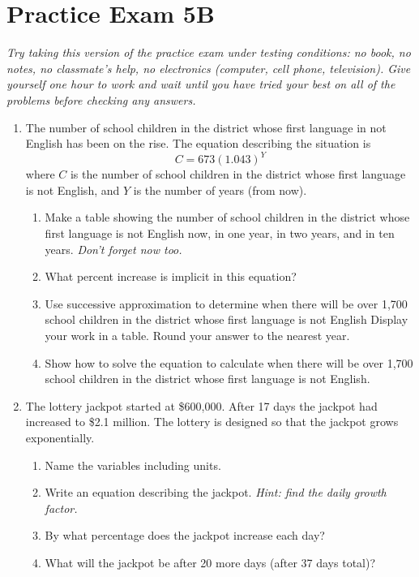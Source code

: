 
\section*{Practice Exam 5B}  

\emph{Try taking this version of the practice exam under testing conditions:  no book, no notes, no classmate's help, no electronics (computer, cell phone, television). Give yourself one hour to work and wait until you have tried your best on all of the problems before checking any answers.}

\noindent \hrulefill

\begin{enumerate}

\item The number of school children in the district whose first language in not English has been on the rise.  The equation describing the situation is $$C=673(1.043)^Y$$ where $C$ is the number of school children in the district whose first language is not English, and $Y$ is the number of years (from now).
\begin{enumerate}
\item Make a table showing the number of school children in the district whose first language is not English now, in one year, in two years, and in ten years. \emph{Don't forget now too.} 
\vfill
\vfill
\item What percent increase is implicit in this equation?
\vfill
\item Use successive approximation to determine when there will be over 1,700 school children in the district whose first language is not English Display your work in a table.  Round your answer to the nearest year. 
\vfill
\vfill
\item Show how to solve the equation to calculate when there will be over 1,700 school children in the district whose first language is not English. 
\vfill
\vfill
\end{enumerate}  

\newpage

\item The lottery jackpot started at \$600,000.  After 17 days the jackpot had increased to \$2.1 million.  The lottery is designed so that the jackpot grows exponentially.

\begin{enumerate}
\item Name the variables including units. 
\vfill
\item Write an equation describing the jackpot.  \emph{Hint:  find the daily growth factor.} 
\vfill
\vfill
\item By what percentage does the jackpot increase each day? 
\vfill
\item What will the jackpot be after 20 more days (after 37 days total)? 
\vfill
\end{enumerate} 


\end{enumerate}
